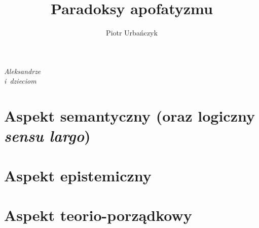 \documentclass[12pt,a4paper,oneside,leqno,titlepage]{report}
\title{Paradoksy apofatyzmu}
\author{Piotr Urbańczyk}
\theoremstyle{definition}
\begin{document}


\stronatytulowaalt

\thispagestyle{empty}
\vspace*{19cm}
\begin{flushright}
\textit{Aleksandrze\\i~dzieciom}
\end{flushright}
\newpage






\tableofcontents

\cleardoublepage


\cleardoublepage






\part{Aspekt semantyczny (oraz logiczny \textit{sensu largo})}






\part{Aspekt epistemiczny}



\part{Aspekt teorio-porządkowy}









%
\end{document}
